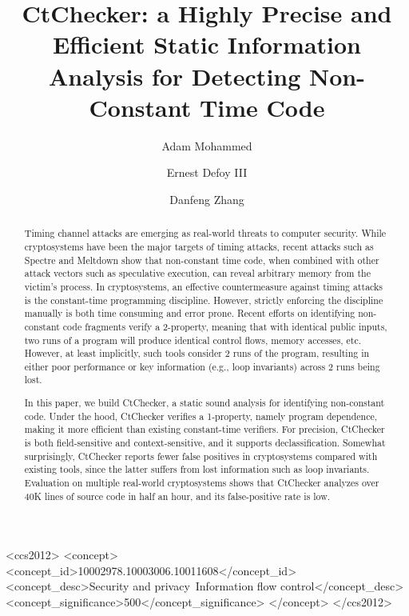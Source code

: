 \documentclass[sigconf, authorversion]{acmart}
\newcommand{\sysname}{CtChecker}
\begin{document}
\title{\sysname: a Highly Precise and Efficient Static Information Analysis for
Detecting Non-Constant Time Code}

\author{Adam Mohammed}

\author{Ernest Defoy III}

\author{Danfeng Zhang}


\begin{abstract}
Timing channel attacks are emerging as real-world threats to computer security.
While cryptosystems have been the major targets of timing attacks, recent
attacks such as Spectre and Meltdown show that non-constant time code, when
combined with other attack vectors such as speculative execution, can reveal
arbitrary memory from the victim's process.  In cryptosystems, an effective
countermeasure against timing attacks is the constant-time programming
discipline. However, strictly enforcing the discipline manually is both time
consuming and error prone. Recent efforts on identifying non-constant code
fragments verify a 2-property, meaning that with identical public inputs, two
runs of a program will produce identical control flows, memory accesses, etc.
However, at least implicitly, such tools consider 2 runs of the program,
resulting in either poor performance or key information (e.g., loop invariants)
across 2 runs being lost.

In this paper, we build \sysname, a static sound analysis for identifying
non-constant code. Under the hood, \sysname{} verifies a 1-property, namely
program dependence, making it more efficient than existing constant-time
verifiers. For precision, \sysname{} is both field-sensitive and
context-sensitive, and it supports declassification. Somewhat surprisingly,
\sysname{} reports fewer false positives in cryptosystems compared with
existing tools, since the latter suffers from lost information such as loop
invariants. Evaluation on multiple real-world cryptosystems shows that
\sysname{} analyzes over 40K lines of source code in half an hour, and its
false-positive rate is low.
\end{abstract}


%
%
 \begin{CCSXML}
<ccs2012>
<concept>
<concept_id>10002978.10003006.10011608</concept_id>
<concept_desc>Security and privacy~Information flow control</concept_desc>
<concept_significance>500</concept_significance>
</concept>
</ccs2012>
\end{CCSXML}

%
%


\keywords{}



\maketitle









\end{document}
